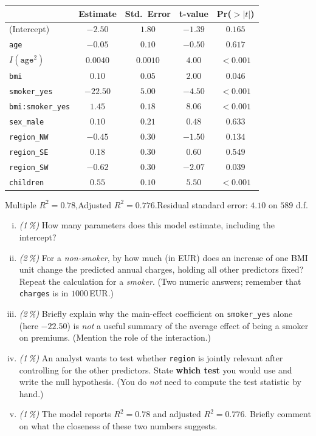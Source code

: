\documentclass[11pt,a4paper]{article}
\newcommand{\subpoints}[1]{\textit{(#1\,\%)}}
\begin{document}
\begin{center}\small
\begin{tabular}{lcccc}
\toprule
 & \textbf{Estimate} & \textbf{Std.\ Error} & \textbf{t-value} & \textbf{Pr($>|t|$)} \\
\midrule
(Intercept)              & $-2.50$  & $1.80$    & $-1.39$  & $0.165$ \\
\texttt{age}             & $-0.05$  & $0.10$    & $-0.50$  & $0.617$ \\
$I(\texttt{age}^2)$      & $0.0040$ & $0.0010$  & $4.00$   & $<0.001$ \\
\texttt{bmi}             & $0.10$   & $0.05$    & $2.00$   & $0.046$ \\
\texttt{smoker\_yes}     & $-22.50$ & $5.00$    & $-4.50$  & $<0.001$ \\
\texttt{bmi:smoker\_yes} & $1.45$   & $0.18$    & $8.06$   & $<0.001$ \\
\texttt{sex\_male}       & $0.10$   & $0.21$    & $0.48$   & $0.633$ \\
\texttt{region\_NW}      & $-0.45$  & $0.30$    & $-1.50$  & $0.134$ \\
\texttt{region\_SE}      & $0.18$   & $0.30$    & $0.60$   & $0.549$ \\
\texttt{region\_SW}      & $-0.62$  & $0.30$    & $-2.07$  & $0.039$ \\
\texttt{children}        & $0.55$   & $0.10$    & $5.50$   & $<0.001$ \\
\bottomrule
\end{tabular}
\end{center}

\noindent Multiple $R^2 = 0.78$,\quad Adjusted $R^2 = 0.776$.\quad Residual standard error: $4.10$ on $589$ d.f.

\begin{enumerate}[(i)]
  \item \subpoints{1} How many parameters does this model estimate, including the intercept?
  \item \subpoints{2} For a \emph{non-smoker}, by how much (in EUR) does an increase of one BMI unit change the predicted annual charges, holding all other predictors fixed? Repeat the calculation for a \emph{smoker}. (Two numeric answers; remember that \texttt{charges} is in $1000$\,EUR.)
  \item \subpoints{2} Briefly explain why the main-effect coefficient on \texttt{smoker\_yes} alone (here $-22.50$) is \emph{not} a useful summary of the average effect of being a smoker on premiums. (Mention the role of the interaction.)
  \item \subpoints{1} An analyst wants to test whether \texttt{region} is jointly relevant after controlling for the other predictors. State \textbf{which test} you would use and write the null hypothesis. (You do \emph{not} need to compute the test statistic by hand.)
  \item \subpoints{1} The model reports $R^2 = 0.78$ and adjusted $R^2 = 0.776$. Briefly comment on what the closeness of these two numbers suggests.
\end{enumerate}
\end{document}
